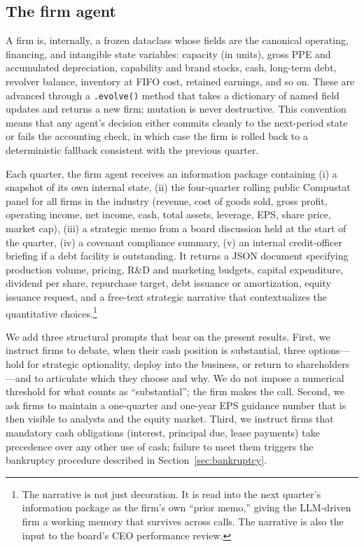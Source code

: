 \documentclass[11pt]{article}
\begin{document}
\subsection{The firm agent}\label{sec:firmagent}

A firm is, internally, a frozen dataclass whose fields are the canonical
operating, financing, and intangible state variables: capacity (in
units), gross PPE and accumulated depreciation, capability and brand
stocks, cash, long-term debt, revolver balance, inventory at FIFO cost,
retained earnings, and so on. These are advanced through a
\texttt{.evolve()} method that takes a dictionary of named field updates
and returns a new firm; mutation is never destructive. This convention
means that any agent's decision either commits cleanly to the next-period
state or fails the accounting check, in which case the firm is rolled
back to a deterministic fallback consistent with the previous quarter.

Each quarter, the firm agent receives an information package containing
(i) a snapshot of its own internal state, (ii) the four-quarter rolling
public Compustat panel for all firms in the industry (revenue, cost of
goods sold, gross profit, operating income, net income, cash, total
assets, leverage, EPS, share price, market cap), (iii) a strategic memo
from a board discussion held at the start of the quarter, (iv) a
covenant compliance summary, (v) an internal credit-officer briefing if
a debt facility is outstanding. It returns a JSON document specifying
production volume, pricing, R\&D and marketing budgets, capital
expenditure, dividend per share, repurchase target, debt issuance or
amortization, equity issuance request, and a free-text strategic
narrative that contextualizes the quantitative choices.\footnote{The
narrative is not just decoration. It is read into the next quarter's
information package as the firm's own ``prior memo,'' giving the
LLM-driven firm a working memory that survives across calls. The
narrative is also the input to the board's CEO performance review.}

We add three structural prompts that bear on the present results.
First, we instruct firms to debate, when their cash position is
substantial, three options---hold for strategic optionality, deploy into
the business, or return to shareholders---and to articulate which they
choose and why. We do not impose a numerical threshold for what counts as
``substantial''; the firm makes the call. Second, we ask firms to
maintain a one-quarter and one-year EPS guidance number that is then
visible to analysts and the equity market. Third, we instruct firms that
mandatory cash obligations (interest, principal due, lease payments)
take precedence over any other use of cash; failure to meet them
triggers the bankruptcy procedure described in
Section~\ref{sec:bankruptcy}.
\end{document}
